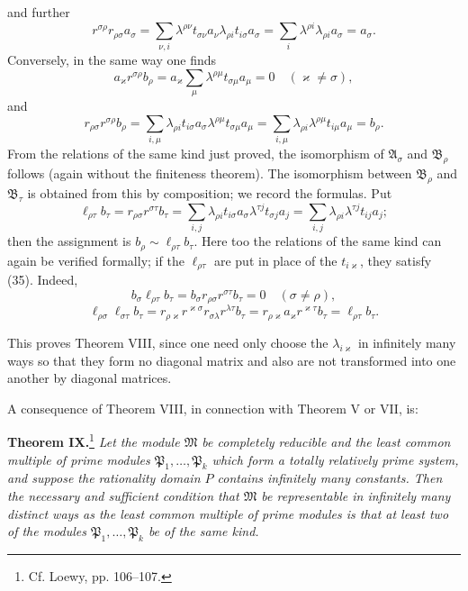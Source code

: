 \documentclass[11pt]{article}
\begin{document}
and further
\[
 r^{\sigma\rho}r_{\rho\sigma}a_\sigma
 =\sum_{\nu,i}\lambda^{\rho\nu}t_{\sigma\nu}a_\nu\lambda_{\rho i}t_{i\sigma}a_\sigma
 =\sum_i\lambda^{\rho i}\lambda_{\rho i}a_\sigma=a_\sigma.
\]
Conversely, in the same way one finds
\[
 a_\varkappa r^{\sigma\rho}b_\rho
 =a_\varkappa\sum_\mu\lambda^{\rho\mu}t_{\sigma\mu}a_\mu=0
 \quad(\varkappa\ne\sigma),
\]
and
\[
 r_{\rho\sigma}r^{\sigma\rho}b_\rho
 =\sum_{i,\mu}\lambda_{\rho i}t_{i\sigma}a_\sigma\lambda^{\rho\mu}t_{\sigma\mu}a_\mu
 =\sum_{i,\mu}\lambda_{\rho i}\lambda^{\rho\mu}t_{i\mu}a_\mu=b_\rho.
\]
From the relations of the same kind just proved, the isomorphism of $\mathfrak A_\sigma$ and $\mathfrak B_\rho$ follows (again without the finiteness theorem). The isomorphism between $\mathfrak B_\rho$ and $\mathfrak B_\tau$ is obtained from this by composition; we record the formulas. Put
\[
 \ell_{\rho\tau}b_\tau=r_{\rho\sigma}r^{\sigma\tau}b_\tau
 =\sum_{i,j}\lambda_{\rho i}t_{i\sigma}a_\sigma\lambda^{\tau j}t_{\sigma j}a_j
 =\sum_{i,j}\lambda_{\rho i}\lambda^{\tau j}t_{ij}a_j;
\]
then the assignment is $b_\rho\sim\ell_{\rho\tau}b_\tau$. Here too the relations of the same kind can again be verified formally; if the $\ell_{\rho\tau}$ are put in place of the $t_{i\varkappa}$, they satisfy (35). Indeed,
\[
 b_\sigma\ell_{\rho\tau}b_\tau=b_\sigma r_{\rho\sigma}r^{\sigma\tau}b_\tau=0\quad(\sigma\ne\rho),
\]
\[
 \ell_{\rho\sigma}\ell_{\sigma\tau}b_\tau=r_{\rho\varkappa}r^{\varkappa\sigma}r_{\sigma\lambda}r^{\lambda\tau}b_\tau
 =r_{\rho\varkappa}a_\varkappa r^{\varkappa\tau}b_\tau=\ell_{\rho\tau}b_\tau.
\]

This proves Theorem VIII, since one need only choose the $\lambda_{i\varkappa}$ in infinitely many ways so that they form no diagonal matrix and also are not transformed into one another by diagonal matrices.

A consequence of Theorem VIII, in connection with Theorem V or VII, is:

\textbf{Theorem IX.}\footnote{Cf. Loewy, pp. 106--107.} \emph{Let the module $\mathfrak M$ be completely reducible and the least common multiple of prime modules $\mathfrak P_1,
\ldots,
\mathfrak P_k$ which form a totally relatively prime system, and suppose the rationality domain $P$ contains infinitely many constants. Then the necessary and sufficient condition that $\mathfrak M$ be representable in infinitely many distinct ways as the least common multiple of prime modules is that at least two of the modules $\mathfrak P_1,
\ldots,
\mathfrak P_k$ be of the same kind.}
\end{document}
